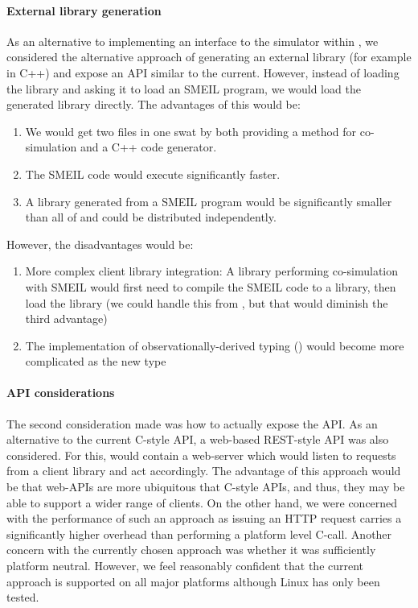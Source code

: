 \paragraph{External library generation}
As an alternative to implementing an interface to the simulator within
\libsme{}, we considered the alternative approach of generating an external
library (for example in C++) and expose an API similar to the current. However,
instead of loading the \libsme{} library and asking it to load an SMEIL program,
we would load the generated library directly. The advantages of this would be:
\begin{enumerate}
\item We would get two files in one swat by both providing a method for
  co-simulation and a C++ code generator.
\item The SMEIL code would execute significantly faster.
\item A library generated from a SMEIL program would be significantly smaller
  than all of \libsme{} and could be distributed independently.
\end{enumerate}
However, the disadvantages would be:
\begin{enumerate}
\item More complex client library integration: A library performing
  co-simulation with SMEIL would first need to compile the SMEIL code to a
  library, then load the library (we could handle this from \libsme{}, but
  that would diminish the third advantage)
\item The implementation of observationally-derived typing ()
  would become more complicated as the new type
\end{enumerate}
    
\paragraph{API considerations}
The second consideration made was how to actually expose the API. As an
alternative to the current C-style API, a web-based REST-style API was also
considered. For this, \libsme{} would contain a web-server which would
listen to requests from a client library and act accordingly. The advantage of
this approach would be that web-APIs are more ubiquitous that C-style APIs, and
thus, they may be able to support a wider range of clients. On the other hand,
we were concerned with the performance of such an approach as issuing an HTTP
request carries a significantly higher overhead than performing a platform level
C-call. Another concern with the currently chosen approach was whether it was
sufficiently platform neutral. However, we feel reasonably confident that the
current approach is supported on all major platforms although Linux has only
been tested.


